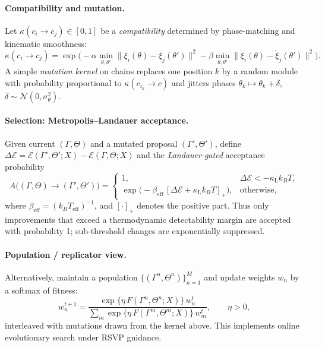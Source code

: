 \documentclass[a4paper,11pt]{article}
\begin{document}
\paragraph{Compatibility and mutation.}
Let $\kappa(c_i\!\to\! c_j)\in[0,1]$ be a \emph{compatibility} determined by
phase-matching and kinematic smoothness:
\begin{equation}
\label{eq:compat}
\kappa(c_i\!\to\! c_j)
=
\exp\!\Big(
-\alpha \min_{\theta,\theta'} \|\xi_i(\theta)-\xi_j(\theta')\|^2
-\beta \min_{\theta,\theta'} \|\dot\xi_i(\theta)-\dot\xi_j(\theta')\|^2
\Big).
\end{equation}
A simple \emph{mutation kernel} on chains replaces one position $k$ by a
random module with probability proportional to $\kappa(c_{i_k}\!\to\! c)$
and jitters phases $\theta_k\mapsto \theta_k+\delta$, $\delta\sim \mathcal{N}(0,\sigma_\theta^2)$.

\paragraph{Selection: Metropolis–Landauer acceptance.}
Given current $(\Gamma,\Theta)$ and a mutated proposal $(\Gamma',\Theta')$,
define $\Delta \mathcal{E}=\mathcal{E}(\Gamma',\Theta';X)-\mathcal{E}(\Gamma,\Theta;X)$
and the \emph{Landauer-gated} acceptance probability
\begin{equation}
\label{eq:metropolis-landauer}
A\big((\Gamma,\Theta)\!\to\!(\Gamma',\Theta')\big)
=
\begin{cases}
1, & \Delta \mathcal{E}< -\kappa_{\mathrm{L}} k_B T,\\[4pt]
\exp\!\Big(-\beta_{\mathrm{eff}}\,[\Delta \mathcal{E}+ \kappa_{\mathrm{L}} k_B T]_+\Big), & \text{otherwise,}
\end{cases}
\end{equation}
where $\beta_{\mathrm{eff}}=(k_B T_{\mathrm{eff}})^{-1}$, and $[\cdot]_+$ denotes the positive part.
Thus only improvements that exceed a thermodynamic detectability margin are
accepted with probability 1; sub-threshold changes are exponentially suppressed.

\paragraph{Population / replicator view.}
Alternatively, maintain a population $\{(\Gamma^n,\Theta^n)\}_{n=1}^M$ and update
weights $w_n$ by a softmax of fitness:
\begin{equation}
\label{eq:replicator}
w_n^{t+1}
=
\frac{\exp\{\eta\,F(\Gamma^n,\Theta^n;X)\}\,w_n^t}{
\sum_m \exp\{\eta\,F(\Gamma^m,\Theta^m;X)\}\,w_m^t},
\qquad \eta>0,
\end{equation}
interleaved with mutations drawn from the kernel above. This implements
online evolutionary search under RSVP guidance.
\end{document}
